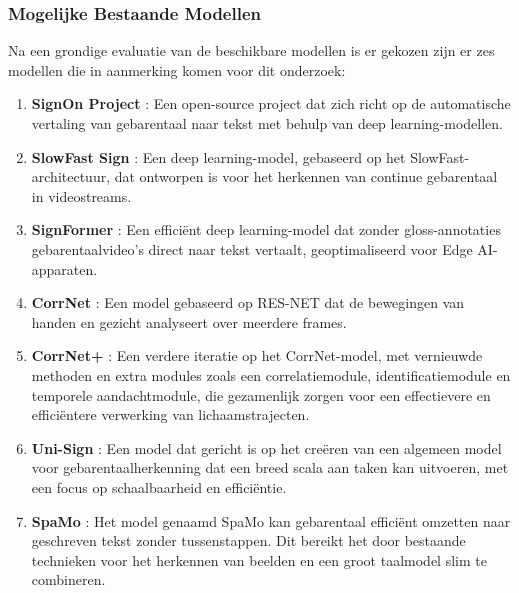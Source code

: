 \subsubsection{Mogelijke Bestaande Modellen}
Na een grondige evaluatie van de beschikbare modellen is er gekozen zijn er zes modellen die in aanmerking komen voor dit onderzoek:
\begin{enumerate}
  \item \textbf{SignOn Project} \autocite{shterionov-etal-2024-signon}: Een open-source project dat zich richt op de automatische vertaling van gebarentaal naar tekst met behulp van deep learning-modellen.
  \item \textbf{SlowFast Sign} \autocite{10445841}: Een deep learning-model, gebaseerd op het SlowFast-architectuur, dat ontworpen is voor het herkennen van continue gebarentaal in videostreams.
  \item \textbf{SignFormer} \autocite{eta2024signformer}: Een efficiënt deep learning-model dat zonder gloss-annotaties gebarentaalvideo's direct naar tekst vertaalt, geoptimaliseerd voor Edge AI-apparaten.
  \item \textbf{CorrNet} \autocite{hu2023continuoussignlanguagerecognition}: Een model gebaseerd op RES-NET dat de bewegingen van handen en gezicht analyseert over meerdere frames.
  \item \textbf{CorrNet+} \autocite{hu2024corrnetsignlanguagerecognition}: Een verdere iteratie op het CorrNet-model, met vernieuwde methoden en extra modules zoals een correlatiemodule, identificatiemodule en temporele aandachtmodule, die gezamenlijk zorgen voor een effectievere en efficiëntere verwerking van lichaamstrajecten.
  \item \textbf{Uni-Sign} \autocite{li2025uni}: Een model dat gericht is op het creëren van een algemeen model voor gebarentaalherkenning dat een breed scala aan taken kan uitvoeren, met een focus op schaalbaarheid en efficiëntie.
  \item \textbf{SpaMo} \autocite{spaMo}: Het model genaamd SpaMo kan gebarentaal efficiënt omzetten naar geschreven tekst zonder tussenstappen. Dit bereikt het door bestaande technieken voor het herkennen van beelden en een groot taalmodel slim te combineren.
\end{enumerate}

